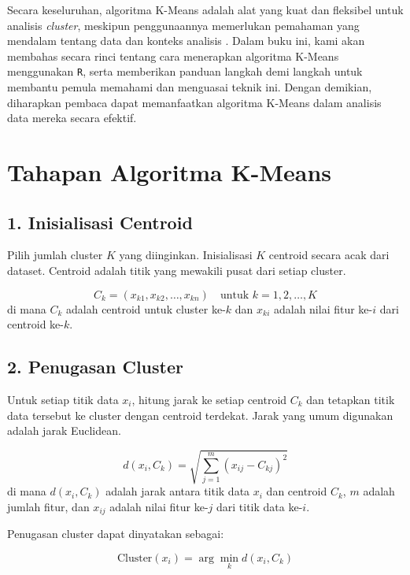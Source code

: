 \documentclass[
  oneside]{book}
\begin{document}
Secara keseluruhan, algoritma K-Means adalah alat yang kuat dan fleksibel untuk analisis \emph{cluster}, meskipun penggunaannya memerlukan pemahaman yang mendalam tentang data dan konteks analisis \citep{bishop2006pattern}. Dalam buku ini, kami akan membahas secara rinci tentang cara menerapkan algoritma K-Means menggunakan \texttt{R}, serta memberikan panduan langkah demi langkah untuk membantu pemula memahami dan menguasai teknik ini. Dengan demikian, diharapkan pembaca dapat memanfaatkan algoritma K-Means dalam analisis data mereka secara efektif.

\section{Tahapan Algoritma K-Means}\label{tahapan-algoritma-k-means}

\subsection*{1. Inisialisasi Centroid}\label{inisialisasi-centroid}

Pilih jumlah cluster \(K\) yang diinginkan. Inisialisasi \(K\) centroid secara acak dari dataset. Centroid adalah titik yang mewakili pusat dari setiap cluster.

\[
C_k = (x_{k1}, x_{k2}, \ldots, x_{kn}) \quad \text{untuk } k = 1, 2, \ldots, K
\]
di mana \(C_k\) adalah centroid untuk cluster ke-\(k\) dan \(x_{ki}\) adalah nilai fitur ke-\(i\) dari centroid ke-\(k\).

\subsection*{2. Penugasan Cluster}\label{penugasan-cluster}

Untuk setiap titik data \(x_i\), hitung jarak ke setiap centroid \(C_k\) dan tetapkan titik data tersebut ke cluster dengan centroid terdekat. Jarak yang umum digunakan adalah jarak Euclidean.

\[
d(x_i, C_k) = \sqrt{\sum_{j=1}^{m} (x_{ij} - C_{kj})^2}
\]
di mana \(d(x_i, C_k)\) adalah jarak antara titik data \(x_i\) dan centroid \(C_k\), \(m\) adalah jumlah fitur, dan \(x_{ij}\) adalah nilai fitur ke-\(j\) dari titik data ke-\(i\).

Penugasan cluster dapat dinyatakan sebagai:

\[
\text{Cluster}(x_i) = \arg\min_{k} d(x_i, C_k)
\]
\end{document}
